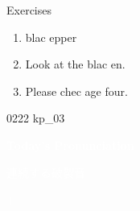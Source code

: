 \documentclass[aspectratio=169,xcolor={dvipsnames,table}]{beamer}
\begin{document}
\begin{frame}[plain]{Exercises }
  \Large
  \begin{enumerate}
    \item<2-> blac  epper
    \item<4-> Look at the blac  en.
    \item<6-> Please chec  age four.
  \end{enumerate}

  \hfill{\tiny 0222}\,{\scriptsize {}\,kp\_03}

\end{frame}
\begin{frame}
  \centering
  \textcolor{white}{\Huge\bfseries Today's Pronunciation}

  \vspace{30pt}

  \textcolor{white}{\Large 連続する破裂音}

  \textcolor{white}{\Large {} $+$ }
\end{frame}
\end{document}
